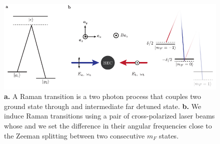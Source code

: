 \begin{figure}[htb]
\begin{center}
\includegraphics[]{Figures/Chapter3/Raman_coupling.pdf}
\caption[Raman coupling with two-photon transitions]{{\bf a.} A Raman transition is a two photon process that couples two ground state through and intermediate far detuned state. {\bf b.} We induce Raman transitions using a pair of cross-polarized laser beams whose and we set the difference in their angular frequencies close to the Zeeman splitting between two consecutive $m_F$ states. }
\label{fig:Raman_coupling}
\end{center}
\end{figure}


